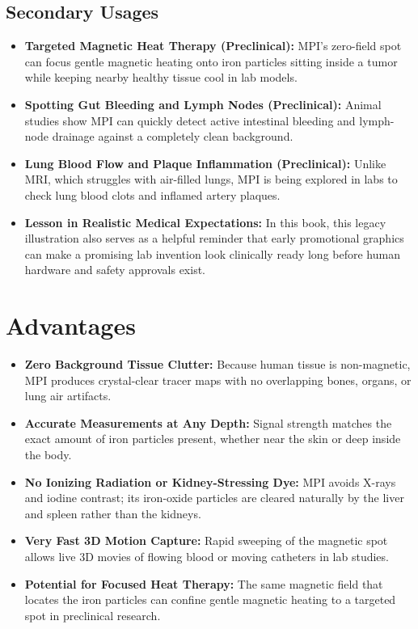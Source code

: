 \subsection{Secondary Usages}
\begin{itemize}
  \item \textbf{Targeted Magnetic Heat Therapy (Preclinical):} MPI's zero-field spot can focus gentle magnetic heating onto iron particles sitting inside a tumor while keeping nearby healthy tissue cool in lab models.
  \item \textbf{Spotting Gut Bleeding and Lymph Nodes (Preclinical):} Animal studies show MPI can quickly detect active intestinal bleeding and lymph-node drainage against a completely clean background.
  \item \textbf{Lung Blood Flow and Plaque Inflammation (Preclinical):} Unlike MRI, which struggles with air-filled lungs, MPI is being explored in labs to check lung blood clots and inflamed artery plaques.
  \item \textbf{Lesson in Realistic Medical Expectations:} In this book, this legacy illustration also serves as a helpful reminder that early promotional graphics can make a promising lab invention look clinically ready long before human hardware and safety approvals exist.
\end{itemize}

\section{Advantages}
\begin{itemize}
  \item \textbf{Zero Background Tissue Clutter:} Because human tissue is non-magnetic, MPI produces crystal-clear tracer maps with no overlapping bones, organs, or lung air artifacts.
  \item \textbf{Accurate Measurements at Any Depth:} Signal strength matches the exact amount of iron particles present, whether near the skin or deep inside the body.
  \item \textbf{No Ionizing Radiation or Kidney-Stressing Dye:} MPI avoids X-rays and iodine contrast; its iron-oxide particles are cleared naturally by the liver and spleen rather than the kidneys.
  \item \textbf{Very Fast 3D Motion Capture:} Rapid sweeping of the magnetic spot allows live 3D movies of flowing blood or moving catheters in lab studies.
  \item \textbf{Potential for Focused Heat Therapy:} The same magnetic field that locates the iron particles can confine gentle magnetic heating to a targeted spot in preclinical research.
\end{itemize}


